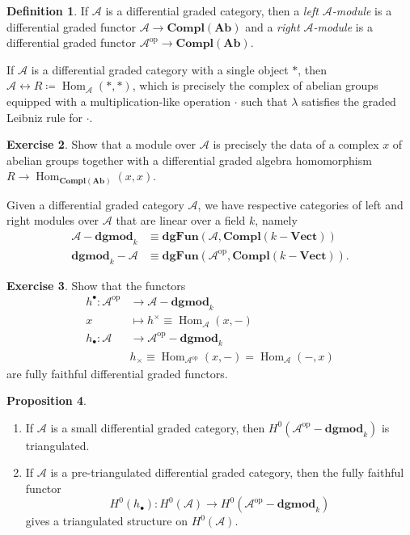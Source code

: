 \documentclass[10pt,letterpaper,cm]{nupset}
\theoremstyle{definition}
\newtheorem{definition}{Definition}[subsection]
\theoremstyle{theorem}
\newtheorem{prop}[definition]{Proposition}
\newtheorem{exercise}[definition]{Exercise}
\theoremstyle{remark}
\newcommand{\A}{\mathcal A}
\newcommand{\1}{\mathbf{1}}
\renewcommand{\a}{\mathscr{A}}
\newcommand{\0}{\vec 0}
\DeclareMathOperator{\op}{op}
\DeclareMathOperator{\Hom}{Hom}
\begin{document}
\begin{definition}
If $\a$ is a differential graded category, then a \textit{left $\a$-module} is a differential graded functor $\a \to \mathbf{Compl}(\mathbf{Ab})$ and a \textit{right $\a$-module} is a differential graded functor $\a^{\op} \to \mathbf{Compl}(\mathbf{Ab})$.
\end{definition}

 If $ \a$ is a differential graded category with a single object $\ast$, then $\a \leftrightarrow R \coloneqq \Hom_{\a}(\ast, \ast)$, which is precisely the complex of abelian groups equipped with a multiplication-like operation $\cdot$ such that $\lambda$ satisfies the graded Leibniz rule for $\cdot$.  

\begin{exercise} 
Show that a module over $\a$ is precisely the data of a complex $x$ of abelian groups together with a differential graded algebra homomorphism $R \to \Hom_{\mathbf{Compl}(\mathbf{Ab})}(x, x)$.

\end{exercise}

 Given a differential graded category $\a$, we have respective categories of left and right modules over $\a$  that are linear over a field $k$, namely 
\begin{align*}
  \a{-}\mathbf{dgmod}_k  & \equiv \mathbf{dgFun}(\A, \mathbf{Compl}(k{-}\mathbf{Vect}))
\\  \mathbf{dgmod}_k{-}\a & \equiv \mathbf{dgFun}(\A^{\op}, \mathbf{Compl}(k{-}\mathbf{Vect})).
\end{align*}

\begin{exercise}
Show that the functors
\begin{align*}
h^{\bullet} : \a^{\op} & \to  \a{-}\mathbf{dgmod}_k  
\\ x & \mapsto h^{\times} \equiv \Hom_{\a}(x, {-})
\\ h_{\bullet} : \a & \to \a^{\op}{-}\mathbf{dgmod}_k
\\ & h_{\times} \equiv \Hom_{\a^{\op}}(x, {-}) = \Hom_{\a}({-}, x)
\end{align*} are fully faithful differential graded functors.
\end{exercise}

\begin{prop} $ $
\begin{enumerate}
\item If $ \a$ is a small differential graded category, then $H^0(\a^{\op}{-}\mathbf{dgmod}_k)$ is triangulated. 
\item If $ \a$ is a pre-triangulated differential graded category, then the fully faithful  functor $$H^{0}(h_{\bullet}) : H^0(\a) \to H^0(\a^{\op}{-}\mathbf{dgmod}_k)$$ gives a triangulated structure on $H^0(\a)$. 
\end{enumerate}
\end{prop}
\end{document}
